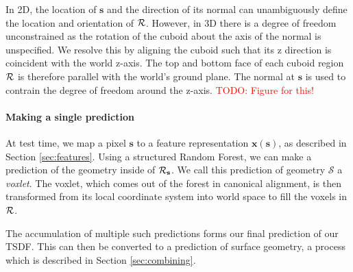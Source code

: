 \documentclass[10pt,twocolumn,letterpaper]{article}
\makeatletter
\renewcommand*{\ie}{i.e.\@\xspace}
\newcommand{\feat}{\mathbf{x}}
\newcommand{\rgbdimage}{\mathcal{D}}
\newcommand{\pixelidx}{\mathbf{s}}
\newcommand{\project}{\mathbf{p}}
\newcommand{\point}{\mathbf{p}}
\newcommand{\normal}{\mathbf{n}}
\newcommand{\updir}{\mathbf{u}}
\newcommand{\todo}[1]{\textcolor{red}{TODO: #1}}
\newcommand{\remove}[1]{\textcolor{grey}{#1}}
\makeatother
\begin{document}
In 2D, the location of $\pixelidx$ and the direction of its normal can unambiguously define the location and orientation of $\mathcal{R}$.
However, in 3D there is a degree of freedom unconstrained as the rotation of the cuboid about the axis of the normal is unspecified.
We resolve this by aligning the cuboid such that its z direction is coincident with the world z-axis.
The top and bottom face of each cuboid region $\mathcal{R}$ is therefore parallel with the world's ground plane.
The normal at $\pixelidx$ is used to contrain the degree of freedom around the z-axis.
\todo{Figure for this!}


\paragraph{Making a single prediction}
At test time, we map a pixel $\pixelidx$ to a feature representation $\feat(\pixelidx)$, as described in Section \ref{sec:features}.
Using a structured Random Forest, we can make a prediction of the geometry inside of $\voxregion_\pixelidx$.
We call this prediction of geometry $\mathcal{S}$ a \emph{voxlet}.
The voxlet, which comes out of the forest in canonical alignment, is then transformed from its local coordinate system into world space to fill the voxels in $\mathcal{R}$.

The accumulation of multiple such predictions forms our final prediction of our TSDF.
This can then be converted to a prediction of surface geometry, a process which is described in Section \ref{sec:combining}.
\end{document}
